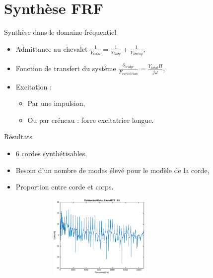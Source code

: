 \section{Synthèse FRF}

\begin{frame}{Synthèse dans le domaine fréquentiel}

 \begin{itemize}
  \item Admittance au chevalet
  \( \frac{1}{Y_{total}} = \frac{1}{Y_{body}} + \frac{1}{Y_{string}} \),
  
  \item Fonction de transfert du système
  \( \frac{\delta_{bridge}}{F_{excitation}} = \frac{Y_{total}H}{j\omega} \),

  \item Excitation :
  	\begin{itemize}
	 \item Par une impulsion,
	 \item Ou par créneau : force excitatrice longue.
     \end{itemize}

   
 \end{itemize}
\end{frame}

\begin{frame}{Résultats}

	\begin{itemize}
		\item 6 cordes synthétisables,
		\item Besoin d'un nombre de modes élevé pour le modèle de la corde,
		\item Proportion entre corde et corps.
		
	\end{itemize}
	 \begin{figure}
		\centering
		\includegraphics[width=8cm,height=4cm]{figures/frf_synthesized_sound_E4.eps}
	\end{figure}
\end{frame}